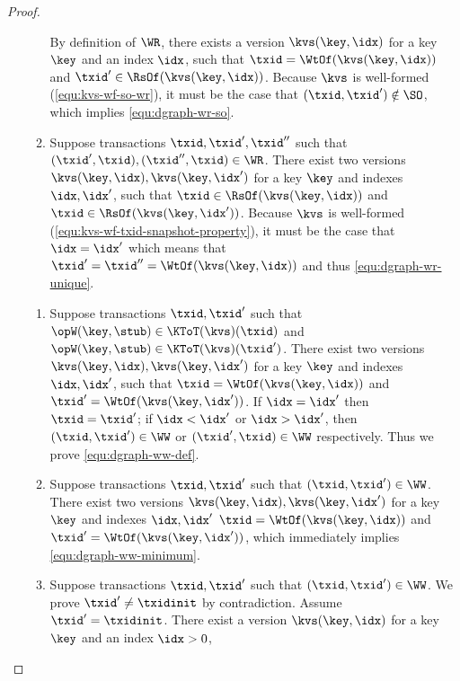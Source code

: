 \begin{toappendix}
\begin{proof}
\begin{enumerate}
\begin{enumerate}
        By definition of \( \WR \), there exists a version \( \kvs(\key,\idx) \) 
        for a key \( \key \) and an index \( \idx \), such that \( \txid = \WtOf(\kvs(\key,\idx))\)
        and \( \txid' \in \RsOf(\kvs(\key,\idx))\).
        Because \(\kvs\) is well-formed (\cref{equ:kvs-wf-so-wr}), it must be the case that \((\txid,\txid') \notin \SO \),
        which implies \cref{equ:dgraph-wr-so}.
    \item Suppose transactions \( \txid, \txid', \txid''\) such that \( (\txid', \txid), (\txid'', \txid)\in \WR \).
        There exist two versions \(\kvs(\key,\idx),\kvs(\key,\idx') \)
        for a key \( \key \) and indexes \( \idx,\idx' \), such that \( \txid \in \RsOf(\kvs(\key,\idx))\)
        and \( \txid \in \RsOf(\kvs(\key,\idx'))\).
        Because \(\kvs\) is well-formed (\cref{equ:kvs-wf-txid-snapshot-property}), 
        it must be the case that \( \idx = \idx' \) which means that \( \txid' = \txid'' = \WtOf(\kvs(\key,\idx)) \)
        and thus \cref{equ:dgraph-wr-unique}.
    \end{enumerate}
    \begin{enumerate}
    \item Suppose transactions \( \txid, \txid' \) such that 
        \( \opW(\key,\stub) \in \KToT(\kvs)(\txid) \) and \( \opW(\key,\stub) \in \KToT(\kvs)(\txid') \).
        There exist two versions \(\kvs(\key,\idx),\kvs(\key,\idx') \)
        for a key \( \key \) and indexes \( \idx,\idx' \), such that 
        \( \txid = \WtOf(\kvs(\key,\idx))\) and \( \txid' = \WtOf(\kvs(\key,\idx'))\).
        If \( \idx = \idx'\) then \( \txid = \txid' \);
        if \( \idx < \idx' \) or \( \idx > \idx' \),
        then \( (\txid,\txid') \in \WW \) or \( (\txid',\txid) \in \WW \) respectively.
        Thus we prove \cref{equ:dgraph-ww-def}.
    \item Suppose transactions \( \txid, \txid'\) such that \( (\txid, \txid') \in \WW \).
        There exist two versions \(\kvs(\key,\idx),\kvs(\key,\idx') \)
        for a key \( \key \) and indexes \( \idx,\idx' \)
        \( \txid = \WtOf(\kvs(\key,\idx))\) and \( \txid' = \WtOf(\kvs(\key,\idx'))\),
        which immediately implies \cref{equ:dgraph-ww-minimum}.
    \item Suppose transactions \( \txid, \txid'\) such that \( (\txid, \txid') \in \WW \).
        We prove \( \txid' \neq \txidinit \) by contradiction.
        Assume \( \txid' = \txidinit \).
        There exist a version \(\kvs(\key,\idx)\) for a key \( \key \) and an index \( \idx > 0 \),

\end{enumerate}
\end{enumerate}
\end{proof}
\end{toappendix}
